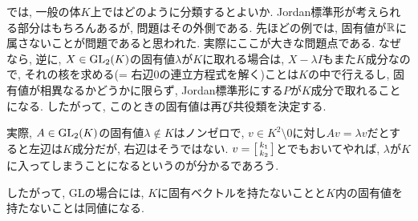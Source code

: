 では, 一般の体$K$上ではどのように分類するとよいか. Jordan標準形が考えられる部分はもちろんあるが, 問題はその外側である. 先ほどの例では, 固有値が$\mathbb{R}$に属さないことが問題であると思われた. 実際にここが大きな問題点である. なぜなら, 逆に, $X \in \mathrm{GL}_{2}(K)$の固有値$\lambda$が$K$に取れる場合は, $X-\lambda I$もまた$K$成分なので, それの核を求める(= 右辺0の連立方程式を解く)ことは$K$の中で行えるし, 固有値が相異なるかどうかに限らず, Jordan標準形にする$P$が$K$成分で取れることになる.  したがって, このときの固有値は再び共役類を決定する. \par
\begin{rem}   実際, $A\in \mathrm{GL}_{2}(K)$の固有値$\lambda\notin K$はノンゼロで, $v\in K^2\setminus{0}$に対し$Av = \lambda v$だとすると左辺は$K$成分だが, 右辺はそうではない. $v = \left[\begin{smallmatrix}k_1 \\ k_2\end{smallmatrix}\right]$とでもおいてやれば, $\lambda$が$K$に入ってしまうことになるというのが分かるであろう.
\end{rem}
したがって, GLの場合には, $K$に固有ベクトルを持たないことと$K$内の固有値を持たないことは同値になる.

